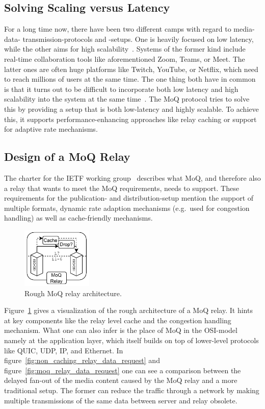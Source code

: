 \subsection{Solving Scaling versus Latency}
For a long time now, there have been two different camps with regard to media-data-
transmission-protocols and -setups.
One is heavily focused on low latency, while the other aims for high scalability~\parencite{what-is-moq}.
Systems of the former kind include real-time collaboration tools like aforementioned Zoom, Teams, or Meet.
The latter ones are often huge platforms like Twitch, YouTube, or Netflix, which need to 
reach millions of users at the same time.
The one thing both have in common is that it turns out to be difficult to incorporate both 
low latency and high scalability into the system at the same time~\parencite{what-is-moq}.
The MoQ protocol tries to solve this by providing a setup that is both low-latency and
highly scalable.
To achieve this, it supports performance-enhancing approaches like relay caching or support 
for adaptive rate mechanisms. %

\subsection{Design of a MoQ Relay}
The charter for the IETF working group~\parencite{moq-charter} describes what MoQ, and therefore also a relay 
that wants to meet the MoQ requirements, needs to support.
These requirements for the publication- and distribution-setup mention the support of 
multiple formats, dynamic rate adaption mechanisms (e.g.~used for congestion handling)
as well as cache-friendly mechanisms.

\begin{figure}[H]
    \centering
    \includegraphics[width=0.3\textwidth]{figures/02_background/moq-relay.drawio.pdf}
    \caption[Rough MoQ relay architecture]{Rough MoQ relay architecture.}\label{fig:moq_relay_architecture}
\end{figure}

Figure~\ref{fig:moq_relay_architecture} gives a visualization of the rough architecture
of a MoQ relay.
It hints at key components like the relay level cache and the congestion handling
mechanism.
What one can also infer is the place of MoQ in the OSI-model namely at the application
layer, which itself builds on top of lower-level protocols like QUIC, UDP, IP, and Ethernet.
In figure~\ref{fig:non_caching_relay_data_request} and figure~\ref{fig:moq_relay_data_request} 
one can see a comparison between the delayed fan-out of the media content caused by the MoQ 
relay and a more traditional setup.
The former can reduce the traffic through a network by making multiple transmissions
of the same data between server and relay obsolete.

